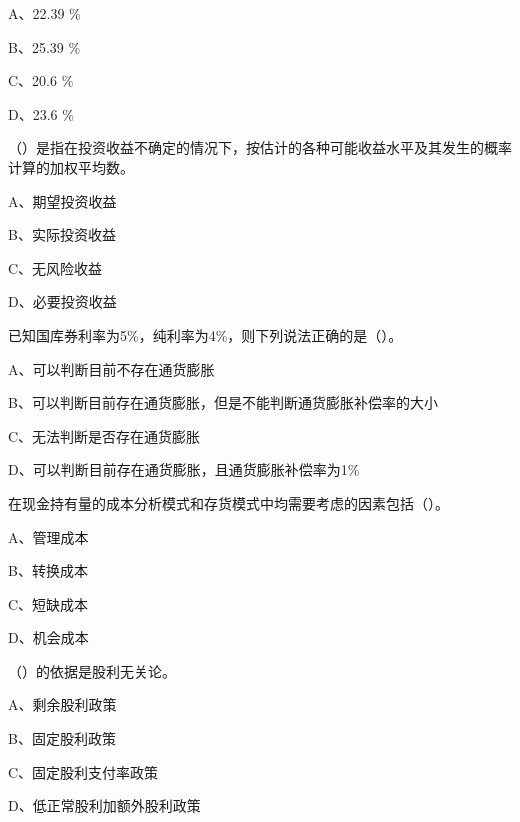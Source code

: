 \documentclass[
  10pt,
  twoside,
  openany,
  b5paper, %
  colorscheme = black, %
  xits = false,
]{qyxf-book}
\begin{document}
A、22.39 \%

B、25.39 \%

C、20.6 \%

D、23.6 \%

 （\qquad）是指在投资收益不确定的情况下，按估计的各种可能收益水平及其发生的概率计算的加权平均数。

A、期望投资收益

B、实际投资收益

C、无风险收益

D、必要投资收益

 已知国库券利率为5\%，纯利率为4\%，则下列说法正确的是（\qquad）。

A、可以判断目前不存在通货膨胀

B、可以判断目前存在通货膨胀，但是不能判断通货膨胀补偿率的大小

C、无法判断是否存在通货膨胀

D、可以判断目前存在通货膨胀，且通货膨胀补偿率为1\%

 在现金持有量的成本分析模式和存货模式中均需要考虑的因素包括（\qquad）。

A、管理成本

B、转换成本

C、短缺成本

D、机会成本

 （\qquad）的依据是股利无关论。

A、剩余股利政策

B、固定股利政策

C、固定股利支付率政策

D、低正常股利加额外股利政策
\end{document}
